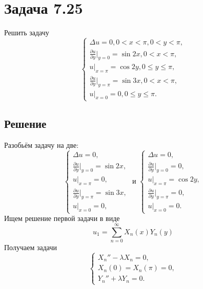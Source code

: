 \documentclass[11pt]{article}
\begin{document}
\section{Задача 7.25}
\label{sec:orgea6ebe3}
Решить задачу
\begin{equation}
\begin{cases}
\Delta u = 0, 0 < x < \pi, 0 < y < \pi, \\
\frac{\partial u}{\partial y}\bigg|_{y = 0} = \sin2x, 0 < x < \pi, \\
u|_{x = \pi} = \cos2y, 0 \leq y \leq \pi, \\
\frac{\partial u}{\partial y}\bigg|_{y = \pi} = \sin3x, 0 < x < \pi, \\
u|_{x = 0} = 0, 0 \leq y \leq \pi.
\end{cases}
\end{equation}
\subsection{Решение}
\label{sec:org0f02bad}
Разобьём задачу на две:
\begin{equation}
\begin{cases}
\Delta u = 0, \\
\frac{\partial u}{\partial y}\bigg|_{y = 0} = \sin2x, \\
u|_{x = \pi} = 0, \\
\frac{\partial u}{\partial y}\bigg|_{y = \pi} = \sin3x, \\
u|_{x = 0} = 0,
\end{cases}
\text{ и }
\begin{cases}
\Delta u = 0, \\
\frac{\partial u}{\partial y}\bigg|_{y = 0} = 0, \\
u|_{x = \pi} = \cos 2y, \\
\frac{\partial u}{\partial y}\bigg|_{y = \pi} = 0, \\
u|_{x = 0} = 0.
\end{cases}
\end{equation}
Ищем решение первой задачи в виде
\begin{equation*}
u_1 = \sum_{n = 0}^{\infty}X_n(x)Y_n(y)
\end{equation*}
Получаем задачи
\begin{equation*}
\begin{cases}
X_n'' - \lambda X_n = 0, \\
X_n(0) = X_n(\pi) = 0, \\
Y_n'' + \lambda Y_n = 0.
\end{cases}
\end{equation*}
\end{document}
